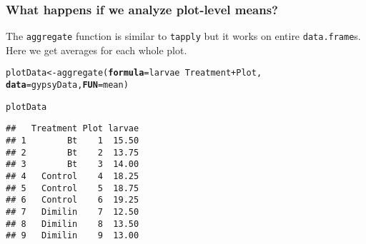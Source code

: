 \documentclass[color=usenames,dvipsnames]{beamer}\usepackage[]{graphicx}\usepackage[]{color}
\makeatletter
\newcommand{\hlopt}[1]{\textcolor[rgb]{0,0,0}{#1}}%
\newcommand{\hlstd}[1]{\textcolor[rgb]{0,0,0}{#1}}%
\newcommand{\hlkwb}[1]{\textcolor[rgb]{0,0.341,0.682}{#1}}%
\newcommand{\hlkwc}[1]{\textcolor[rgb]{0,0,0}{\textbf{#1}}}%
\newcommand{\hlkwd}[1]{\textcolor[rgb]{0.004,0.004,0.506}{#1}}%
\newenvironment{kframe}{%
 \def\at@end@of@kframe{}%
 \ifinner\ifhmode%
  \def\at@end@of@kframe{\end{minipage}}%
  \begin{minipage}{\columnwidth}%
 \fi\fi%
 \def\FrameCommand##1{\hskip\@totalleftmargin \hskip-\fboxsep
 \colorbox{shadecolor}{##1}\hskip-\fboxsep
     \hskip-\linewidth \hskip-\@totalleftmargin \hskip\columnwidth}%
 \MakeFramed {\advance\hsize-\width
   \@totalleftmargin\z@ \linewidth\hsize
   \@setminipage}}%
 {\par\unskip\endMakeFramed%
 \at@end@of@kframe}
\newenvironment{knitrout}{}{} %
\newcommand{\inr}[1]{\colorbox{inlinecolor}{\texttt{#1}}}
\makeatother
\begin{document}
\begin{frame}[fragile]
  \frametitle{What happens if we analyze plot-level means?}
  The \inr{aggregate} function is similar to \inr{tapply} but it
  works on entire {\tt data.frame}s. Here we get averages for each whole plot.
  \footnotesize
\begin{knitrout}
\color{fgcolor}\begin{kframe}
\begin{alltt}
\hlstd{plotData} \hlkwb{<-} \hlkwd{aggregate}\hlstd{(}\hlkwc{formula}\hlstd{=larvae} \hlopt{~} \hlstd{Treatment} \hlopt{+} \hlstd{Plot,}
                      \hlkwc{data}\hlstd{=gypsyData,} \hlkwc{FUN}\hlstd{=mean)}
\end{alltt}
\end{kframe}
\end{knitrout}
\pause
\begin{knitrout}
\color{fgcolor}\begin{kframe}
\begin{alltt}
\hlstd{plotData}
\end{alltt}
\begin{verbatim}
##   Treatment Plot larvae
## 1        Bt    1  15.50
## 2        Bt    2  13.75
## 3        Bt    3  14.00
## 4   Control    4  18.25
## 5   Control    5  18.75
## 6   Control    6  19.25
## 7   Dimilin    7  12.50
## 8   Dimilin    8  13.50
## 9   Dimilin    9  13.00
\end{verbatim}
\end{kframe}
\end{knitrout}
\end{frame}
\end{document}
